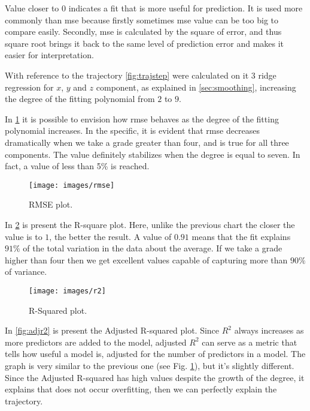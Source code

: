 \begin{itemize}
    Value closer to $0$ indicates a fit that is more useful for prediction. It is used more commonly than \gls{mse} because firstly sometimes \gls{mse} value can be too big to compare easily. Secondly, \gls{mse} is calculated by the square of error, and thus square root brings it back to the same level of prediction error and makes it easier for interpretation.
\end{itemize}

\noindent With reference to the trajectory \ref{fig:trajstep} were calculated on it $3$ ridge regression for $x$, $y$ and $z$ component, as explained in \ref{sec:smoothing}, increasing the degree of the fitting polynomial from $2$ to $9$.

\noindent In \ref{fig:rmse} it is possible to envision how \gls{rmse} behaves as the degree of the fitting polynomial increases. In the specific, it is evident that \gls{rmse} decreases dramatically when we take a grade greater than four, and is true for all three components. The value definitely stabilizes when the degree is equal to seven. In fact, a value of less than 5\% is reached.

\begin{figure}[H]
	\centering
	\texttt{[image: images/rmse]}
	\caption[RMSE.]{RMSE plot.}
	\label{fig:rmse}
\end{figure}

\noindent In \ref{fig:r2} is present the R-square plot. Here, unlike the previous chart the closer the value is to $1$, the better the result. A value of $0.91$ means that the fit explains $91\%$ of the total variation in the data about the average. If we take a grade higher than four then we get excellent values capable of capturing more than $90\%$ of variance.

\begin{figure}[H]
	\centering
	\texttt{[image: images/r2]}
	\caption[R-Squared.]{R-Squared plot.}
	\label{fig:r2}
\end{figure}

\noindent In \ref{fig:adjr2} is present the Adjusted R-squared plot. Since $R^2$ always increases as more predictors are added to the model, adjusted $R^2$ can serve as a metric that tells how useful a model is, adjusted for the number of predictors in a model. The graph is very similar to the previous one (see Fig. \ref{fig:rmse}), but it’s slightly different. Since the Adjusted R-squared has high values despite the growth of the degree, it explains that does not occur overfitting, then we can perfectly explain the trajectory.

